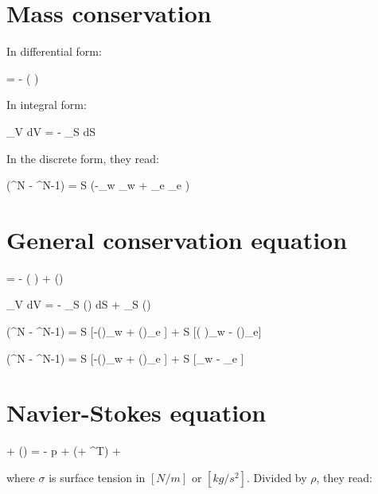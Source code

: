 \documentclass{report}
\begin{document}
  

\section{Mass conservation}

In differential form:

\be
   = - \nabla ( \rho \uvw )
\ee

In integral form:

\be
  \int_V  dV = - \int_S \rho \uvw dS
\ee

In the discrete form, they read:

\be
    (\rho^N - \rho^{N-1}) 
   = 
   \Delta S (-\rho_w \uvw_w + \rho_e \uvw_e )
\ee

\section{General conservation equation}

\be
  = 
  - \nabla ( \rho \uvw \phi) 
  + \nabla (\Gamma \nabla \phi)
\ee

\be
  \int_V  dV 
  = 
  - \int_S (\rho \uvw \phi) dS 
  + \int_S (\Gamma \nabla \phi)
\ee

\be
   (\rho^N - \rho^{N-1}) 
  = 
    \Delta S [-(\rho \uvw\phi)_w + (\rho \uvw \phi)_e ] 
  + \Delta S [( \Gamma \nabla \phi)_w - (\Gamma \nabla \phi)_e]
\ee

\be
   (\rho^N - \rho^{N-1}) 
  = 
    \Delta S [-(\rho \uvw\phi)_w + (\rho \uvw \phi)_e ] 
  + \Delta S [\Gamma_w  - 
              \Gamma_e  ]
\ee

\section{Navier-Stokes equation}

\be
  + \nabla (\rho \uvw \uvw)
  =
  - \nabla p
  + \nabla \mu (\nabla \uvw + \nabla \uvw^T)
  + \sigma {}
  \; \; \; \; [ \frac{kg}{m^2 s^2} ]
\ee

where $\sigma$ is surface tension in $[N/m]$ or $[kg/s^2]$.
Divided by $\rho$, they read:
\end{document}
